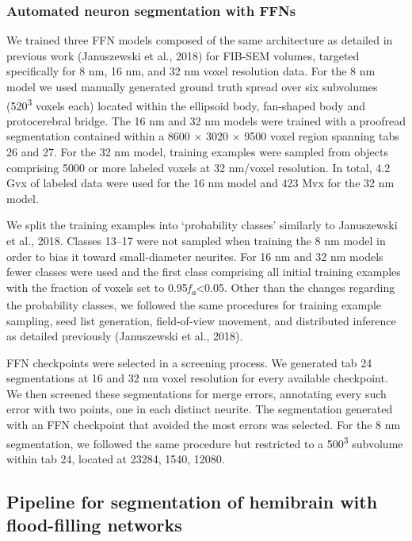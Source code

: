 \documentclass{article}
\begin{document}

\subsubsection*{Automated neuron segmentation with FFNs}

We trained three FFN models composed of the same architecture as detailed in previous work (Januszewski et al., 2018) for FIB-SEM volumes, targeted specifically for 8 nm, 16 nm, and 32 nm voxel resolution data. For the 8 nm model we used manually generated ground truth spread over six subvolumes (520\textsuperscript{3} voxels each) located within the ellipsoid body, fan-shaped body and protocerebral bridge. The 16 nm and 32 nm models were trained with a proofread segmentation contained within a 8600 × 3020 × 9500 voxel region spanning tabs 26 and 27. For the 32 nm model, training examples were sampled from objects comprising 5000 or more labeled voxels at 32 nm/voxel resolution. In total, 4.2 Gvx of labeled data were used for the 16 nm model and 423 Mvx for the 32 nm model.

We split the training examples into ‘probability classes’ similarly to Januszewski et al., 2018. Classes 13–17 were not sampled when training the 8 nm model in order to bias it toward small-diameter neurites. For 16 nm and 32 nm models fewer classes were used and the first class comprising all initial training examples with the fraction of voxels set to 0.95\emph{f}\emph{\textsubscript{a}}<0.05. Other than the changes regarding the probability classes, we followed the same procedures for training example sampling, seed list generation, field-of-view movement, and distributed inference as detailed previously (Januszewski et al., 2018).

FFN checkpoints were selected in a screening process. We generated tab 24 segmentations at 16 and 32 nm voxel resolution for every available checkpoint. We then screened these segmentations for merge errors, annotating every such error with two points, one in each distinct neurite. The segmentation generated with an FFN checkpoint that avoided the most errors was selected. For the 8 nm segmentation, we followed the same procedure but restricted to a 500\textsuperscript{3} subvolume within tab 24, located at 23284, 1540, 12080.

\subsection*{Pipeline for segmentation of hemibrain with flood-filling networks}
\end{document}
